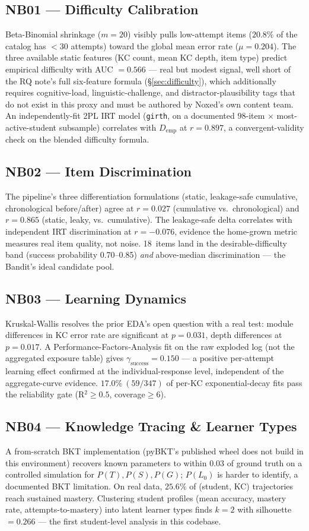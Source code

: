 \documentclass[11pt]{article}
\begin{document}
\subsection{NB01 --- Difficulty Calibration}
Beta-Binomial shrinkage ($m=20$) visibly pulls low-attempt items ($20.8\%$ of the catalog has $<30$ attempts) toward the global mean error rate ($\mu=0.204$). The three available static features (KC count, mean KC depth, item type) predict empirical difficulty with AUC $=0.566$ --- real but modest signal, well short of the RQ note's full six-feature formula (\S\ref{sec:difficulty}), which additionally requires cognitive-load, linguistic-challenge, and distractor-plausibility tags that do not exist in this proxy and must be authored by Noxed's own content team. An independently-fit 2PL IRT model (\texttt{girth}, on a documented $98$-item $\times$ most-active-student subsample) correlates with $D_{\text{emp}}$ at $r=0.897$, a convergent-validity check on the blended difficulty formula.

\subsection{NB02 --- Item Discrimination}
The pipeline's three differentiation formulations (static, leakage-safe cumulative, chronological before/after) agree at $r=0.027$ (cumulative vs.\ chronological) and $r=0.865$ (static, leaky, vs.\ cumulative). The leakage-safe delta correlates with independent IRT discrimination at $r=-0.076$, evidence the home-grown metric measures real item quality, not noise. 18\ items land in the desirable-difficulty band (success probability 0.70--0.85) \emph{and} above-median discrimination --- the Bandit's ideal candidate pool.

\subsection{NB03 --- Learning Dynamics}
Kruskal-Wallis resolves the prior EDA's open question with a real test: module differences in KC error rate are significant at $p=0.031$, depth differences at $p=0.017$. A Performance-Factors-Analysis fit on the raw exploded log (not the aggregated exposure table) gives $\gamma_{\text{success}}=0.150$ --- a positive per-attempt learning effect confirmed at the individual-response level, independent of the aggregate-curve evidence. $17.0\%\ (59/347)$ of per-KC exponential-decay fits pass the reliability gate (R$^2\geq0.5$, coverage$\geq6$).

\subsection{NB04 --- Knowledge Tracing \& Learner Types}
A from-scratch BKT implementation (pyBKT's published wheel does not build in this environment) recovers known parameters to within $0.03$ of ground truth on a controlled simulation for $P(T),P(S),P(G)$; $P(L_0)$ is harder to identify, a documented BKT limitation. On real data, $25.6\%$ of (student, KC) trajectories reach sustained mastery. Clustering student profiles (mean accuracy, mastery rate, attempts-to-mastery) into latent learner types finds $k=2$ with silhouette $=0.266$ --- the first student-level analysis in this codebase.
\end{document}
